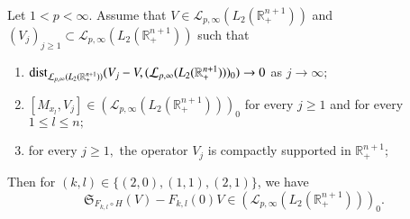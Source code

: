 \documentclass[12pt]{amsart}
\begin{document}
\begin{lemma}\label{criterion lemma}
Let $1<p<\infty$. Assume that $V\in \mathcal{L}_{p,\infty}(L_2(\mathbb{R}^{n+1}_+))$ and $(V_j)_{j\geq1}\subset \mathcal{L}_{p,\infty}(L_2(\mathbb{R}^{n+1}_+))$ such that
\begin{enumerate}[{\rm (i)}]
\item\label{cla} ${\rm dist}_{\mathcal{L}_{p,\infty}(L_2(\mathbb{R}^{n+1}_+))}(V_j-V,(\mathcal{L}_{p,\infty}(L_2(\mathbb{R}^{n+1}_+)))_0)\to 0$ as $j\to\infty;$
\item\label{clb} $[M_{x_l},V_j]\in (\mathcal{L}_{p,\infty}(L_2(\mathbb{R}^{n+1}_+)))_0$ for every $j\geq1$ and for every $1\leq l\leq n;$
\item\label{clc} for every $j\geq 1,$ the operator $V_j$ is compactly supported in $\mathbb{R}^{n+1}_+;$
\end{enumerate}	
Then for $(k,l)\in \{(2,0),(1,1),(2,1)\}$, we have
$$\mathfrak{S}_{F_{k,l}\circ H}(V)-F_{k,l}(0)V\in(\mathcal{L}_{p,\infty}(L_2(\mathbb{R}^{n+1}_+)))_0.$$
\end{lemma}
\end{document}

